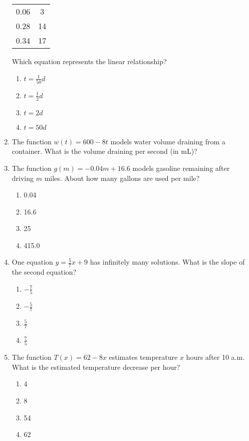 \documentclass[12pt]{exam}
\begin{document}
\begin{enumerate}
\begin{center}
\begin{tabular}{|c|c|}
            \hline
            0.06 & 3 \\
            0.28 & 14 \\
            0.34 & 17 \\
            \hline
        \end{tabular}
    \end{center}
    Which equation represents the linear relationship?
    \begin{enumerate}[label=\Alph*)]
        \item $t = \frac{1}{50}d$
        \item $t = \frac{1}{2}d$
        \item $t = 2d$
        \item $t = 50d$
    \end{enumerate}
    \item The function $w(t) = 600 - 8t$ models water volume draining from a container. What is the volume draining per second (in mL)?
    \item The function $g(m) = -0.04m + 16.6$ models gasoline remaining after driving $m$ miles. About how many gallons are used per mile?
    \begin{enumerate}[label=\Alph*)]
        \item 0.04
        \item 16.6
        \item 25
        \item 415.0
    \end{enumerate}
    \item One equation $y = \frac{5}{7}x + 9$ has infinitely many solutions. What is the slope of the second equation?
    \begin{enumerate}[label=\Alph*)]
        \item $-\frac{7}{5}$
        \item $-\frac{5}{7}$
        \item $\frac{5}{7}$
        \item $\frac{7}{5}$
    \end{enumerate}
    \item The function $T(x) = 62 - 8x$ estimates temperature $x$ hours after 10 a.m. What is the estimated temperature decrease per hour?
    \begin{enumerate}[label=\Alph*)]
        \item 4
        \item 8
        \item 54
        \item 62

\end{enumerate}
\end{enumerate}
\end{document}
